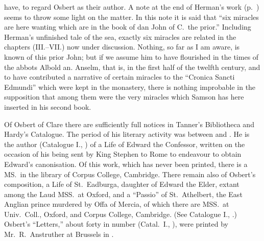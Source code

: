 \documentclass[10pt]{book}
\begin{document}
{have, to regard Osbert as their author. A note at the end of Herman's work (p.\ ) seems to throw some light on the matter. In this note it is said that ``six miracles are here wanting which are in the book of dan John of C.\ the prior.'' Including Herman's unfinished tale of the sea, exactly six miracles are related in the chapters (III.--VII.) now under discussion. Nothing, so far as I am aware, is known of this prior John; but if we assume him to have flourished in the times of the abbots Albold an. Anselm, that is, in the first half of the twelfth century, and to have contributed a narrative of certain miracles to the ``Cronica Sancti Edmundi'' which were kept in the monastery, there is nothing improbable in the supposition that among them were the very miracles which Samson has here inserted in his second book.

Of Osbert of Clare there are sufficiently full notices in Tanner's Bibliotheca and Hardy's Catalogue. The period of his literary activity was between  and . He is the author (Catalogue I., ) of a Life of Edward the Confessor, written on the occasion of his being sent by King Stephen to Rome to endeavour to obtain Edward's canonisation. Of this work, which has never been printed, there is a MS.\ in the library of Corpus College, Cambridge. There remain also of Osbert's composition, a Life of St.\ Eadburga, daughter of Edward the Elder, extant among the Laud MSS.\ at Oxford, and a ``Passio'' of St.\ Athelbert, the East Anglian prince murdered by Offa of Mercia, of which there are MSS.\ at Univ.\ Coll., Oxford, and Corpus College, Cambridge. (See Catalogue I., .) Osbert's ``Letters,'' about forty in number (Catal.\ I., ), were printed by Mr.\ R.\ Anstruther at Brussels in .

}
\end{document}
